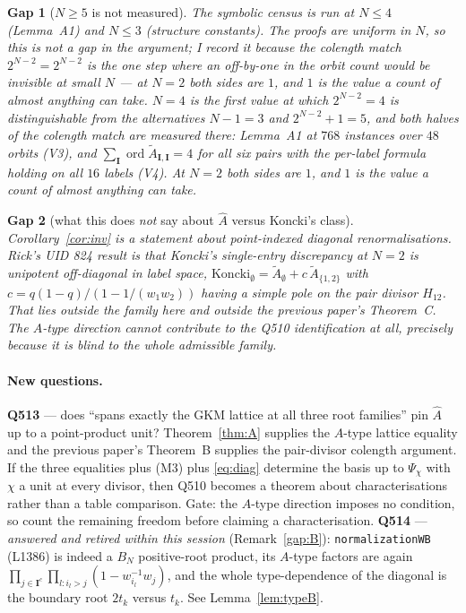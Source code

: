 \documentclass[11pt]{article}
\theoremstyle{plain}
\theoremstyle{definition}
\theoremstyle{remark}
\theoremstyle{plain}
\newtheorem{gapthm}{Gap}
\newcommand{\bI}{\mathbf{I}}
\newcommand{\At}{\widetilde{A}}
\newcommand{\Ah}{\widehat{A}}
\newcommand{\ord}{\operatorname{ord}}
\begin{document}
\begin{gapthm}[$N\ge5$ is not measured]
The symbolic census is run at $N\le4$ (Lemma~A1) and $N\le3$ (structure
constants).  The \emph{proofs} are uniform in $N$, so this is not a gap in the
argument; I record it because the colength match $2^{N-2}=2^{N-2}$ is the one
step where an off-by-one in the orbit count would be invisible at small $N$ ---
at $N=2$ both sides are $1$, and $1$ is the value a count of almost anything can
take.  $N=4$ is the first value at which $2^{N-2}=4$ is distinguishable from the
alternatives $N-1=3$ and $2^{N-2}+1=5$, and both halves of the colength match are
measured there: Lemma~A1 at $768$ instances over $48$ orbits (V3), and
$\sum_\bI\ord\At_{\bI,\bI}=4$ for all six pairs with the per-label formula holding
on all $16$ labels (V4).  At $N=2$ both sides are $1$, and $1$ is the value a
count of almost anything can take.
\end{gapthm}

\begin{gapthm}[what this does \emph{not} say about $\Ah$ versus Koncki's class]
Corollary~\ref{cor:inv} is a statement about point-indexed \emph{diagonal}
renormalisations.  Rick's UID 824 result is that Koncki's single-entry
discrepancy at $N=2$ is \emph{unipotent off-diagonal in label space},
$\mathrm{Koncki}_\emptyset=\At_\emptyset+c\,\At_{\{1,2\}}$ with
$c=q(1-q)/(1-1/(w_1w_2))$ having a simple pole on the pair divisor $H_{12}$.
That lies outside the family here and outside the previous paper's Theorem~C.
The $A$-type direction cannot contribute to the Q510 identification at all,
precisely because it is blind to the whole admissible family.
\end{gapthm}

\paragraph{New questions.}
\textbf{Q513} --- does ``spans exactly the GKM lattice at all three root
families'' pin $\Ah$ up to a point-product unit?  Theorem~\ref{thm:A} supplies
the $A$-type lattice equality and the previous paper's Theorem~B supplies the
pair-divisor colength argument.  If the three equalities plus (M3) plus
\eqref{eq:diag} determine the basis up to $\Psi_\chi$ with $\chi$ a unit at every
divisor, then Q510 becomes a theorem about characterisations rather than a table
comparison.  Gate: the $A$-type direction imposes no condition, so count the
remaining freedom before claiming a characterisation.
\textbf{Q514} --- \emph{answered and retired within this session}
(Remark~\ref{gap:B}): \texttt{normalizationWB} (L1386) is indeed a $B_N$
positive-root product, its $A$-type factors are again
$\prod_{j\in\bI^{c}}\prod_{l:i_l>j}(1-w_{i_l}^{-1}w_j)$, and the whole
type-dependence of the diagonal is the boundary root $2t_k$ versus $t_k$.  See
Lemma~\ref{lem:typeB}.
\end{document}
